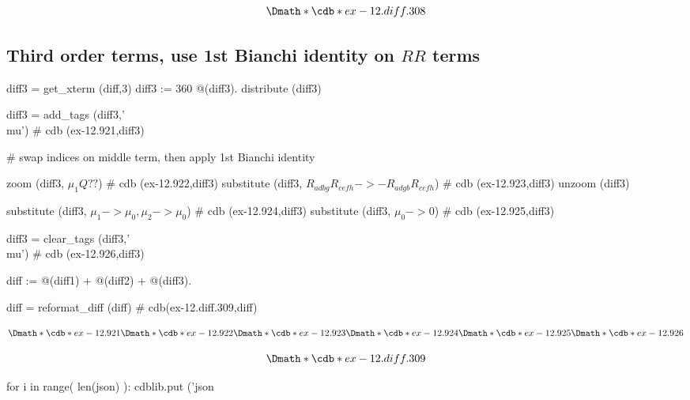 \documentclass[12pt]{cdblatex}
\begin{document}
\begin{dgroup*}
   \Dmath*{\cdb*{ex-12.diff.308}}
\end{dgroup*}

\clearpage

\subsection*{Third order terms, use 1st Bianchi identity on $R R$ terms}

\begin{cadabra}
   diff3  = get_xterm (diff,3)
   diff3 := 360 @(diff3).
   distribute (diff3)

   diff3 = add_tags (diff3,'\\mu')                                              # cdb (ex-12.921,diff3)

   # swap indices on middle term, then apply 1st Bianchi identity

   zoom       (diff3, $\mu_{1} Q??$)                                            # cdb (ex-12.922,diff3)
   substitute (diff3, $R_{a d b g} R_{c e f h} -> - R_{a d g b} R_{c e f h}$)   # cdb (ex-12.923,diff3)
   unzoom     (diff3)

   substitute (diff3, $\mu_{1} -> \mu_{0}, \mu_{2} -> \mu_{0}$)                 # cdb (ex-12.924,diff3)
   substitute (diff3, $\mu_{0} -> 0$)                                           # cdb (ex-12.925,diff3)

   diff3 = clear_tags (diff3,'\\mu')                                            # cdb (ex-12.926,diff3)

   diff := @(diff1) + @(diff2) + @(diff3).

   diff  = reformat_diff (diff)                                                 # cdb(ex-12.diff.309,diff)
\end{cadabra}

\clearpage

\begin{dgroup*}
   \Dmath*{\cdb*{ex-12.921}}
   \Dmath*{\cdb*{ex-12.922}}
   \Dmath*{\cdb*{ex-12.923}}
   \Dmath*{\cdb*{ex-12.924}}
   \Dmath*{\cdb*{ex-12.925}}
   \Dmath*{\cdb*{ex-12.926}}
\end{dgroup*}

\begin{dgroup*}
   \Dmath*{\cdb*{ex-12.diff.309}}
\end{dgroup*}

\clearpage


\bgroup
{}
\begin{cadabra}
   for i in range( len(json) ):
      cdblib.put ('json%
\end{cadabra}
\egroup
\end{document}
